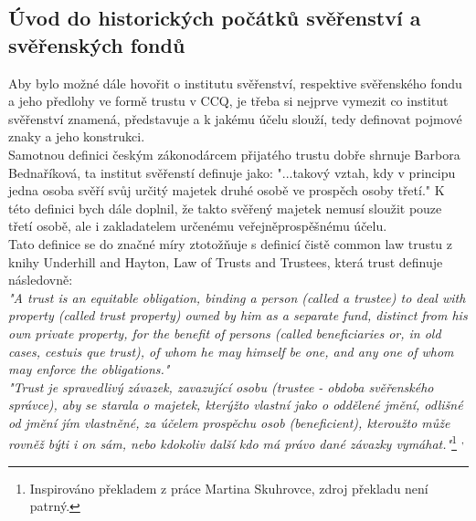 \documentclass{article}
\begin{document}
\newpage

\subsection{Úvod do historických počátků svěřenství a svěřenských fondů}

\indent Aby bylo možné dále hovořit o institutu svěřenství, respektive svěřenského fondu a jeho předlohy ve formě trustu v CCQ, je třeba si nejprve vymezit co institut svěřenství znamená, představuje a k jakému účelu slouží, tedy definovat pojmové znaky a jeho konstrukci.\\

Samotnou definici českým zákonodárcem přijatého trustu dobře shrnuje Bar\-bora Bednaříková, ta institut svěřenstí definuje jako: "...takový vztah, kdy v principu jedna osoba svěří svůj určitý majetek druhé osobě ve prospěch osoby třetí." K této definici bych dále doplnil, že takto svěřený majetek nemusí sloužit pouze třetí osobě, ale i zakladatelem určenému veřejněprospěšnému účelu.\\

Tato definice se do značné míry ztotožňuje s definicí čistě common law trustu z knihy Underhill and Hayton, Law of Trusts and Trustees, která trust definuje následovně:\\ %

\textit{"A trust is an equitable obligation, binding a person (called a trustee) to deal with property (called trust property) owned by him as a separate fund, distinct from his own private property, for the benefit of persons (called beneficiaries or, in old cases, cestuis que trust), of whom he may himself be one, and any one of whom may enforce the obligations."} \\

\textit{"Trust je spravedlivý závazek, zavazující osobu (trustee - obdoba svěřenského správce), aby se starala o majetek, kterýžto vlastní jako o oddělené jmění, odlišné od jmění jím vlastněné, za účelem prospěchu osob (beneficient), kteroužto může rovněž býti i on sám, nebo kdokoliv další kdo má právo dané závazky vymáhat."}\footnote{Inspirováno překladem z práce Martina Skuhrovce, zdroj překladu není patrný.} \textsuperscript{,}   \\
\end{document}
